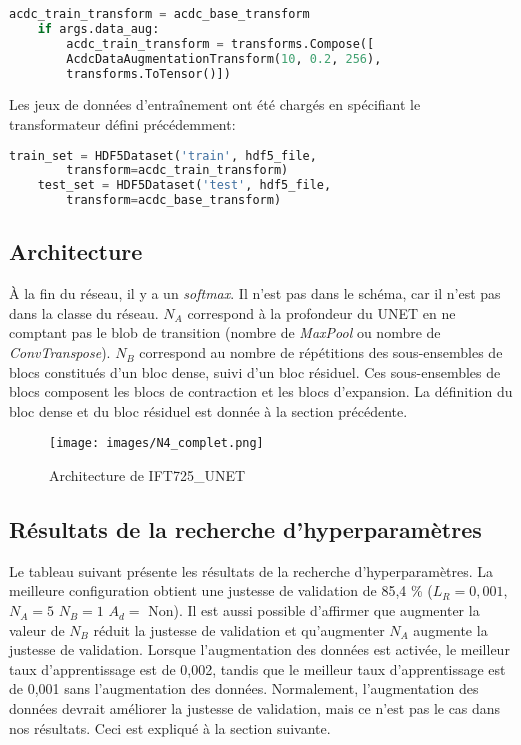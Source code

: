     \begin{lstlisting}[language=python]
    acdc_train_transform = acdc_base_transform
    if args.data_aug:    
        acdc_train_transform = transforms.Compose([
        AcdcDataAugmentationTransform(10, 0.2, 256),
        transforms.ToTensor()])
    \end{lstlisting}
    
    Les jeux de données d'entraînement ont été chargés en spécifiant le transformateur défini précédemment:    
    \begin{lstlisting}[language=python]
    train_set = HDF5Dataset('train', hdf5_file,
        transform=acdc_train_transform)
    test_set = HDF5Dataset('test', hdf5_file,
        transform=acdc_base_transform)    
    \end{lstlisting}

\begin{landscape}
    \subsection{Architecture}
        À la fin du réseau, il y a un \textit{softmax}. Il n'est pas dans le schéma, car il n'est pas dans la classe du réseau. \(N_A\) correspond à la profondeur du UNET en ne comptant pas le blob de transition (nombre de \textit{MaxPool} ou nombre de \textit{ConvTranspose}). \(N_B\) correspond au nombre de répétitions des sous-ensembles de blocs constitués d'un bloc dense, suivi d'un bloc résiduel. Ces sous-ensembles de blocs composent les blocs de contraction et les blocs d'expansion. La définition du bloc dense et du bloc résiduel est donnée à la section précédente.
        \begin{figure}[H]
            \centering 
            \texttt{[image: images/N4\_complet.png]}
            \caption{Architecture de IFT725\_UNET}
        \end{figure}
\end{landscape}

\subsection{Résultats de la recherche d’hyperparamètres}
    Le tableau suivant présente les résultats de la recherche d'hyperparamètres. La meilleure configuration obtient une justesse de validation de 85,4 \% (\(L_R=0,001\), \(N_A=5\) \(N_B=1\) \(A_d =\) Non). Il est aussi possible d'affirmer que augmenter la valeur de \(N_B\) réduit la justesse de validation et qu'augmenter \(N_A\) augmente la justesse de validation. Lorsque l'augmentation des données est activée, le meilleur taux d'apprentissage est de 0,002, tandis que le meilleur taux d'apprentissage est de 0,001 sans l'augmentation des données. Normalement, l'augmentation des données devrait améliorer la justesse de validation, mais ce n'est pas le cas dans nos résultats. Ceci est expliqué à la section suivante.
    
